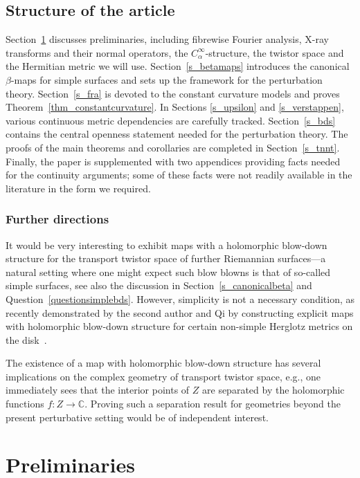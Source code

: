 \documentclass[pdftex]{sigma}
\numberwithin{equation}{section}
\theoremstyle{definition}
\newcommand{\C}{\mathbb{C}} %
\newcommand{\1}{{\bf 1}}
\begin{document}
\subsection{Structure of the article} Section~\ref{s_prelim} discusses preliminaries, including fibrewise Fourier analysis, X-ray transforms and their normal operators, the $C^{\infty}_{\alpha}$-structure, the twistor space and the Hermitian metric we will use.
Section~\ref{s_betamaps} introduces the canonical $\beta$-maps for simple surfaces and sets up the framework for the perturbation theory.
Section~\ref{s_fra} is devoted to the constant curvature models and proves Theorem~\ref{thm_constantcurvature}.
In Sections \ref{s_upsilon} and \ref{s_verstappen},
 various continuous metric dependencies are carefully tracked. Section~\ref{s_bds} contains the central openness statement needed for the perturbation theory.
The proofs of the main theorems and corollaries are completed in Section~\ref{s_tnnt}. Finally, the paper is supplemented with two appendices providing facts needed for the continuity arguments; some of these facts were not readily available in the literature in the form we required.

\subsubsection{Further directions} It would be very interesting to exhibit maps with a holomorphic blow-down structure for the transport twistor space of further Riemannian surfaces---a natural setting where one might expect such blow blowns is that of so-called simple surfaces, see also the discussion in Section~\ref{s_canonicalbeta} and Question~\ref{questionsimplebds}.
However, simplicity is not a necessary condition, as recently demonstrated by the second author and Qi by constructing explicit maps with holomorphic blow-down structure for certain non-simple Herglotz metrics on the disk~\cite{MoQi25}.

The existence of a map with holomorphic blow-down structure has several implications on the complex geometry of transport twistor space, e.g., one immediately sees that the interior points of $Z$ are separated by the holomorphic functions $f\colon Z\to \C$. Proving such a separation result for geometries beyond the present perturbative setting would be of independent interest.

\section{Preliminaries}\label{s_prelim}
\end{document}

